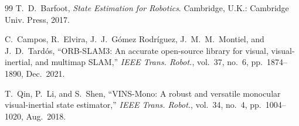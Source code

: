 \begin{thebibliography}{99}
T.~D.~Barfoot,
\textit{State Estimation for Robotics}.
Cambridge, U.K.: Cambridge Univ. Press, 2017.

C.~Campos, R.~Elvira, J.~J.~G\'{o}mez Rodr\'{i}guez, J.~M.~M.~Montiel, and J.~D.~Tard\'{o}s,
``ORB-SLAM3: An accurate open-source library for visual, visual-inertial, and multimap SLAM,''
\textit{IEEE Trans. Robot.}, vol.~37, no.~6, pp.~1874--1890, Dec.~2021.

T.~Qin, P.~Li, and S.~Shen,
``VINS-Mono: A robust and versatile monocular visual-inertial state estimator,''
\textit{IEEE Trans. Robot.}, vol.~34, no.~4, pp.~1004--1020, Aug.~2018.

\end{thebibliography}
